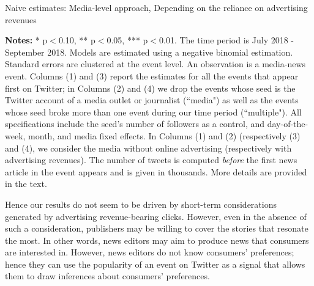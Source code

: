 \begin{table}
\caption{Naive estimates: Media-level approach, Depending on the reliance on advertising revenues}
\begin{center}
	
\end{center}
\begin{spacing}{0.5}
	{\fns \textbf{Notes:} * p$<$0.10, ** p$<$0.05, *** p$<$0.01. The time period is July 2018 - September 2018. Models are estimated using a negative binomial estimation. Standard errors are clustered at the event level. An observation is a media-news event.  Columns (1) and (3) report the estimates for all the events that appear first on Twitter; in Columns (2) and (4)  we drop the events whose seed is the Twitter account of a media outlet or journalist (``media") as well as the events whose seed broke more than one event during our time period (``multiple"). All specifications include the seed's number of followers as a control, and day-of-the-week, month, and media fixed effects. In Columns (1) and (2) (respectively (3) and (4), we consider the media without online advertising (respectively with advertising revenues). The number of tweets is computed \textit{before} the first news article in the event appears and is given in thousands. More details are provided in the text.} 
\end{spacing}
\label{Tab:number_articles_negbinomial_cevent_heterogeneity_advertising}
\end{table} 


Hence our results do not seem to be driven by short-term considerations generated by advertising revenue-bearing clicks. However, even in the absence of such a consideration, publishers may be willing to cover the stories that resonate the most. In other words, news editors may aim to produce news that consumers are interested in. However, news editors do not know consumers' preferences; hence they can use the popularity of an event on Twitter as a signal that allows them to draw inferences about consumers' preferences.

